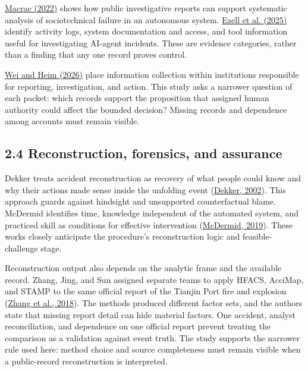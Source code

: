 \documentclass[11pt]{article}
\begin{document}
\href{https://doi.org/10.1111/risa.13850}{Macrae (2022)} shows how public investigative reports can support systematic analysis of sociotechnical failure in an autonomous system. \href{https://doi.org/10.1609/aies.v8i1.36596}{Ezell et al. (2025)} identify activity logs, system documentation and access, and tool information useful for investigating AI-agent incidents. These are evidence categories, rather than a finding that any one record proves control.

\href{https://doi.org/10.1609/aaai.v40i44.41139}{Wei and Heim (2026)} place information collection within institutions responsible for reporting, investigation, and action. This study asks a narrower question of each packet: which records support the proposition that assigned human authority could affect the bounded decision? Missing records and dependence among accounts must remain visible.

\subsection*{2.4 Reconstruction, forensics, and assurance}

Dekker treats accident reconstruction as recovery of what people could know and why their actions made sense inside the unfolding event (\href{https://doi.org/10.1016/S0022-4375(02)00032-4}{Dekker, 2002}). This approach guards against hindsight and unsupported counterfactual blame. McDermid identifies time, knowledge independent of the automated system, and practiced skill as conditions for effective intervention (\href{https://www.york.ac.uk/assuring-autonomy/news/blog/human-control-ai-autonomy/}{McDermid, 2019}). These works closely anticipate the procedure's reconstruction logic and feasible-challenge stage.

Reconstruction output also depends on the analytic frame and the available record. Zhang, Jing, and Sun assigned separate teams to apply HFACS, AcciMap, and STAMP to the same official report of the Tianjin Port fire and explosion (\href{https://doi.org/10.1007/s11668-018-0534-1}{Zhang et al., 2018}). The methods produced different factor sets, and the authors state that missing report detail can hide material factors. One accident, analyst reconciliation, and dependence on one official report prevent treating the comparison as a validation against event truth. The study supports the narrower rule used here: method choice and source completeness must remain visible when a public-record reconstruction is interpreted.
\end{document}
